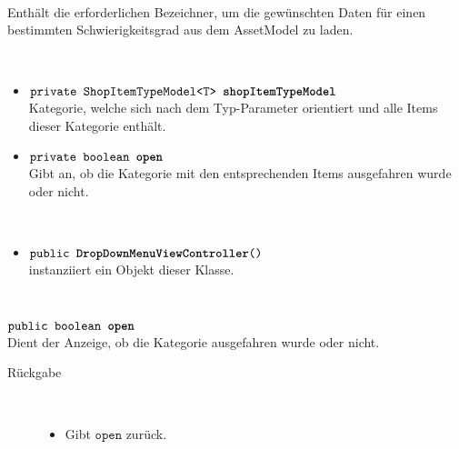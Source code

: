 \begin{description}
\item[Beschreibung] \hfill \\ Enthält die erforderlichen Bezeichner, um die gewünschten Daten für einen bestimmten Schwierigkeitsgrad aus dem AssetModel zu laden.
\item[Attribute] \hfill \\
	\vspace{-.8cm}
	\begin{itemize}	
		\item $\texttt{private ShopItemTypeModel<T> \textbf{shopItemTypeModel}}$ \\ Kategorie, welche sich nach dem Typ-Parameter orientiert und alle Items dieser Kategorie enthält.
		\item $\texttt{private boolean \textbf{open}}$ \\ Gibt an, ob die Kategorie mit den entsprechenden Items ausgefahren wurde oder nicht.

		\end{itemize}
	
\item[Konstruktoren] \hfill \\
	\vspace{-.8cm}
	\begin{itemize}
		\item $\texttt{public \textbf{DropDownMenuViewController}()}$ \\ instanziiert ein Objekt dieser Klasse.

	\end{itemize}
	
\item[Methoden] \hfill \\
	\vspace{-.8cm}
		\item $\texttt{public boolean \textbf{open}}$ \\ Dient der Anzeige, ob die Kategorie ausgefahren wurde oder nicht.
		\begin{description}
			\item[Rückgabe] \hfill \\
			\vspace{-.8cm}
			\begin{itemize}
				\item Gibt $\texttt{open}$ zurück.
			\end{itemize}
			\end{description}
			
		
	\end{description}	

